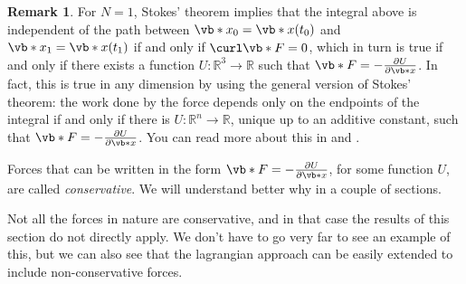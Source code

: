 \documentclass[english,fontsize=11pt,paper=b5]{scrbook}
\theoremstyle{definition}
\newtheorem{remark}{Remark}[chapter]
\begin{document}
    \begin{remark}
      For $N=1$, Stokes' theorem implies that the integral above is independent of the path between $\vb*{x}_0 = \vb*{x}(t_0)$ and $\vb*{x}_1 = \vb*{x}(t_1)$ if and only if $\curl \vb*{F} = 0$, which in turn is true if and only if there exists a function $U:\mathbb{R}^3\to\mathbb{R}$ such that $\vb*{F} = -\frac{\partial U}{\partial \vb*{x}}$.
      In fact, this is true in any dimension by using the general version of Stokes' theorem: the work done by the force depends only on the endpoints of the integral if and only if there is $U:\mathbb{R}^n\to\mathbb{R}$, unique up to an additive constant, such that $\vb*{F} = -\frac{\partial U}{\partial \vb*{x}}$.
      You can read more about this in \cite[Chapter 2.5]{book:arnold} and \cite[Theorem 6.3 and 8.1]{book:knauf}.
    \end{remark}

    Forces that can be written in the form $\vb*{F} = -\frac{\partial U}{\partial \vb*{x}}$, for some function $U$, are called \emph{conservative}.
    We will understand better why in a couple of sections.

    Not all the forces in nature are conservative, and in that case the results of this section do not directly apply.
    We don't have to go very far to see an example of this, but we can also see that the lagrangian approach can be easily extended to include non-conservative forces.
\end{document}
